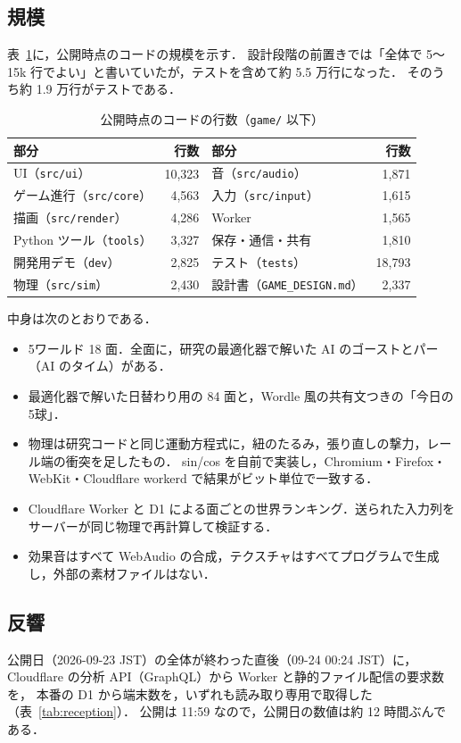 \documentclass[a4paper,10pt]{ltjsarticle}
\newcommand{\tabref}[1]{表~\ref{#1}}
\newcommand{\code}[1]{\texttt{#1}}
\begin{document}
\subsection{規模}
\tabref{tab:size}に，公開時点のコードの規模を示す．
設計段階の前置きでは「全体で 5〜15k 行でよい」と書いていたが，テストを含めて約 5.5 万行になった．
そのうち約 1.9 万行がテストである．

\begin{table}[H]
\centering
\caption{公開時点のコードの行数（\code{game/} 以下）}
\label{tab:size}
\small
\begin{tabular}{lr@{\hspace{3em}}lr}
\toprule
部分 & 行数 & 部分 & 行数 \\
\midrule
UI（\code{src/ui}） & 10,323 & 音（\code{src/audio}） & 1,871 \\
ゲーム進行（\code{src/core}） & 4,563 & 入力（\code{src/input}） & 1,615 \\
描画（\code{src/render}） & 4,286 & Worker & 1,565 \\
Python ツール（\code{tools}） & 3,327 & 保存・通信・共有 & 1,810 \\
開発用デモ（\code{dev}） & 2,825 & テスト（\code{tests}） & 18,793 \\
物理（\code{src/sim}） & 2,430 & 設計書（\code{GAME\_DESIGN.md}） & 2,337 \\
\bottomrule
\end{tabular}
\end{table}

中身は次のとおりである．
\begin{itemize}
  \item 5ワールド 18 面．全面に，研究の最適化器で解いた AI のゴーストとパー（AI のタイム）がある．
  \item 最適化器で解いた日替わり用の 84 面と，Wordle 風の共有文つきの「今日の5球」．
  \item 物理は研究コードと同じ運動方程式に，紐のたるみ，張り直しの撃力，レール端の衝突を足したもの．
  sin/cos を自前で実装し，Chromium・Firefox・WebKit・Cloudflare workerd で結果がビット単位で一致する．
  \item Cloudflare Worker と D1 による面ごとの世界ランキング．送られた入力列をサーバーが同じ物理で再計算して検証する．
  \item 効果音はすべて WebAudio の合成，テクスチャはすべてプログラムで生成し，外部の素材ファイルはない．
\end{itemize}

\subsection{反響}
公開日（2026-09-23 JST）の全体が終わった直後（09-24 00:24 JST）に，Cloudflare の分析 API（GraphQL）から Worker と静的ファイル配信の要求数を，
本番の D1 から端末数を，いずれも読み取り専用で取得した（\tabref{tab:reception}）．
公開は 11:59 なので，公開日の数値は約 12 時間ぶんである．
\end{document}
